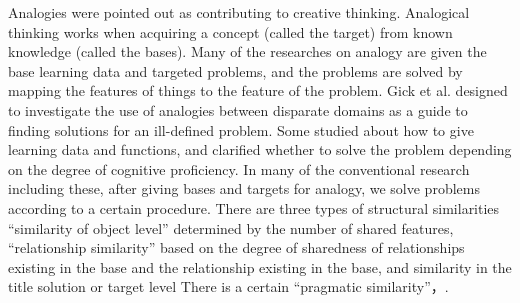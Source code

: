 \documentclass[journal]{IAENGtran}
\begin{document}
Analogies were pointed out as contributing to creative thinking\cite{Codd04}.
Analogical thinking works when acquiring a concept (called the target) from known knowledge (called the bases)\cite{Codd05}.
Many of the researches on analogy are given the base learning data and targeted problems, and the problems are solved by mapping the features of things to the feature of the problem\cite{Codd06}.
Gick et al. designed to investigate the use of analogies between disparate domains as a guide to finding solutions for an ill-defined problem.
Some studied about how to give learning data and functions\cite{Codd07}, and clarified whether to solve the problem depending on the degree of cognitive proficiency\cite{Codd08}.
In many of the conventional research including these, after giving bases and targets for analogy, we solve problems according to a certain procedure.
There are three types of structural similarities ``similarity of object level'' determined by the number of shared features, ``relationship similarity'' based on the degree of sharedness of relationships existing in the base and the relationship existing in the base, and similarity in the title solution or target level There is a certain ``pragmatic similarity''\cite{Codd05}，\cite{Codd09}.
\end{document}

